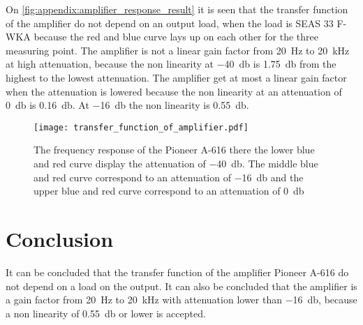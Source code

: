 On \autoref{fig:appendix:amplifier_response_result} it is seen that the transfer function of the amplifier do not depend on an output load, when the load is SEAS 33 F-WKA because the red and blue curve lays up on each other for the three measuring point. The amplifier is not a linear gain factor from \SI{20}{\hertz} to \SI{20}{\kilo\hertz} at high attenuation, because the non linearity at \SI{-40}{\decibel} is \SI{1.75}{\decibel} from the highest to the lowest attenuation. The amplifier get at most a linear gain factor when the attenuation is lowered because the non linearity at an attenuation of \SI{0}{\decibel} is \SI{0.16}{\decibel}. At \SI{-16}{\decibel} the non linearity is \SI{0.55}{\decibel}.



\begin{figure}[H]
	\centering
	\texttt{[image: transfer\_function\_of\_amplifier.pdf]}
	\caption{The frequency response of the Pioneer A-616 there the lower blue and red curve display the attenuation of \SI{-40}{\decibel}. The middle blue and red curve correspond to an attenuation of \SI{-16}{\decibel} and the upper blue and red curve correspond to an attenuation of  \SI{0}{\decibel}}
		\label{fig:appendix:amplifier_response_result}
\end{figure}

\section*{Conclusion}
It can be concluded that the transfer function of the amplifier Pioneer A-616 do not depend on a load on the output. It can also be concluded that the amplifier is a gain factor from \SI{20}{\hertz} to \SI{20}{\kilo\hertz} with attenuation lower than \SI{-16}{\decibel}, because a non linearity of \SI{0.55}{\decibel} or lower is accepted.


